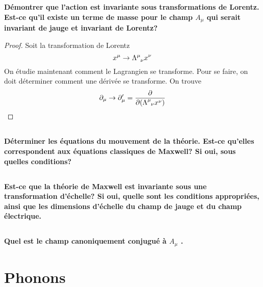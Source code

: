 \documentclass{article}
\numberwithin{equation}{section}
\theoremstyle{solution}
\begin{document}
\subsection{}
\textbf{Démontrer que l’action est invariante sous transformations de Lorentz. Est-ce qu’il existe
un terme de masse pour le champ $A_{\mu}$ qui serait invariant de jauge et invariant de Lorentz?}
\vspace{2ex}
\begin{proof}
Soit la transformation de Lorentz
\begin{equation}
        x^{\mu} \rightarrow \Lambda\indices{^\mu_\nu} x^\nu
\end{equation} 
On étudie maintenant comment le Lagrangien se transforme. Pour se faire, on doit déterminer comment une 
dérivée se transforme. On trouve
\begin{equation}
        \partial_\mu \rightarrow \partial_\mu' = \frac{\partial }{\partial (\Lambda\indices{^\mu_\nu} x^\nu)}
\end{equation} 
        
\end{proof}
\subsection{}
\textbf{Déterminer les équations du mouvement de la théorie. Est-ce qu’elles correspondent aux
équations classiques de Maxwell? Si oui, sous quelles conditions?}
\vspace{2ex}
\subsection{}
\textbf{Est-ce que la théorie de Maxwell est invariante sous une transformation d’échelle? Si
oui, quelle sont les conditions appropriées, ainsi que les dimensions d’échelle du champ de jauge
et du champ électrique.}
\vspace{2ex}
\subsection{}
\textbf{Quel est le champ canoniquement conjugué à $A_\mu$ . 
\vspace{2ex}
}

\section{Phonons}
\subsection{}
\end{document}
